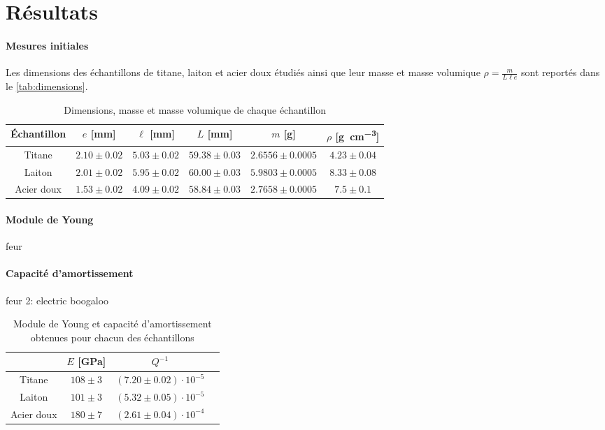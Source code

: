 \section{Résultats}

\paragraph{Mesures initiales} Les dimensions des échantillons de titane, laiton et acier doux étudiés ainsi que leur masse et masse volumique \(\rho = \frac{m}{L \ell e}\) sont reportés dans le \autoref{tab:dimensions}.

\begin{table}[h]
    \centering
    \begin{tabulary}{0.7\linewidth}{c|c c c c c}
        \toprule
        Échantillon & \(e\) [\si{\milli\meter}] & \(\ell\) [\si{\milli\meter}] & \(L\) [\si{\milli\meter}] & \(m\) [\si{\gram}] & \(\rho\) [\si{\gram\per\cubic\centi\meter}] \\
        \midrule
        Titane & \(2.10 \pm 0.02\) & \(5.03 \pm 0.02\) & \(59.38 \pm 0.03\) & \(2.6556 \pm 0.0005\) & \(4.23 \pm 0.04\) \\
        Laiton & \(2.01 \pm 0.02\) & \(5.95 \pm 0.02\) & \(60.00 \pm 0.03\) & \(5.9803 \pm 0.0005\) & \(8.33 \pm 0.08\) \\
        Acier doux & \(1.53 \pm 0.02\) & \(4.09 \pm 0.02\) & \(58.84 \pm 0.03\) & \(2.7658 \pm 0.0005\) & \(7.5 \pm 0.1\) \\
        \bottomrule
    \end{tabulary}
    \caption{Dimensions, masse et masse volumique de chaque échantillon}
    \label{tab:dimensions}
\end{table}

\paragraph{Module de Young} feur

\paragraph{Capacité d'amortissement} feur 2: electric boogaloo

\begin{table}[h]
    \centering
    \begin{tabulary}{0.9\linewidth}{c|C C C}
        \toprule
        & \(E\) [\si{\giga\pascal}] & \(Q^{-1}\) \\
        \midrule
        Titane & \(108 \pm 3\) & \(\left(7.20 \pm 0.02\right) \cdot 10^{-5}\) \\
        Laiton & \(101 \pm 3\) & \(\left(5.32 \pm 0.05\right) \cdot 10^{-5}\) \\
        Acier doux & \(180 \pm 7\) & \(\left(2.61 \pm 0.04\right) \cdot 10^{-4}\) \\
        \bottomrule
    \end{tabulary}    
    \caption{Module de Young et capacité d'amortissement obtenues pour chacun des échantillons}
    \label{tab:young_amortissement}
\end{table}

